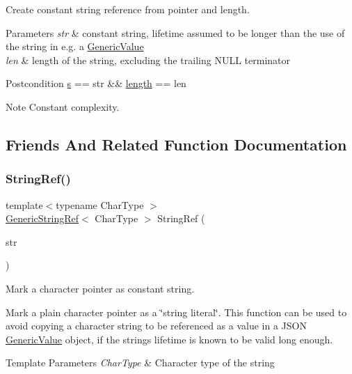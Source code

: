 Create constant string reference from pointer and length. 


\begin{DoxyParams}{Parameters}
{\em str} & constant string, lifetime assumed to be longer than the use of the string in e.\+g. a \hyperlink{class_generic_value}{Generic\+Value} \\
\hline
{\em len} & length of the string, excluding the trailing N\+U\+LL terminator\\
\hline
\end{DoxyParams}
\begin{DoxyPostcond}{Postcondition}
\hyperlink{struct_generic_string_ref_ac555994afd329bc9bc1780acf2f9d9be}{s} == str \&\& \hyperlink{struct_generic_string_ref_a4a96d618744ad73f766a1551b1d517fe}{length} == len 
\end{DoxyPostcond}
\begin{DoxyNote}{Note}
Constant complexity. 
\end{DoxyNote}


\subsection{Friends And Related Function Documentation}
\mbox{\label{struct_generic_string_ref_aa6b9fd9f6aa49405a574c362ba9af6b5}} 
\subsubsection{\texorpdfstring{String\+Ref()}{StringRef()}\hspace{0.1cm}{\footnotesize\ttfamily [1/2]}}
{\footnotesize\ttfamily template$<$typename Char\+Type $>$ \\
\hyperlink{struct_generic_string_ref}{Generic\+String\+Ref}$<$ Char\+Type $>$ String\+Ref (\begin{DoxyParamCaption}\item[{const Char\+Type $\ast$}]{str }\end{DoxyParamCaption})\hspace{0.3cm}{\ttfamily [related]}}



Mark a character pointer as constant string. 

Mark a plain character pointer as a \char`\"{}string literal\char`\"{}. This function can be used to avoid copying a character string to be referenced as a value in a J\+S\+ON \hyperlink{class_generic_value}{Generic\+Value} object, if the string\textquotesingle{}s lifetime is known to be valid long enough. 
\begin{DoxyTemplParams}{Template Parameters}
{\em Char\+Type} & Character type of the string \\
\hline
\end{DoxyTemplParams}

